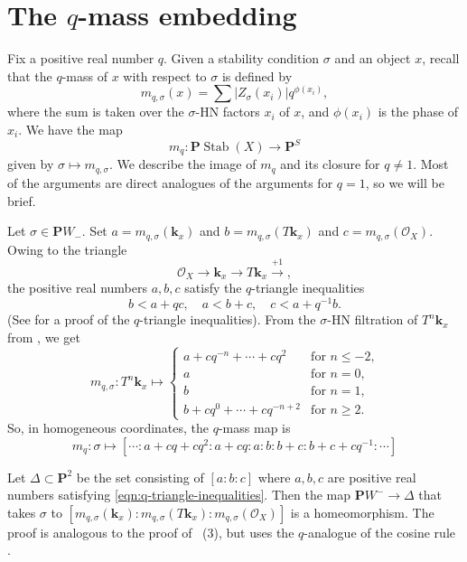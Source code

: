 \documentclass{amsart}
\begin{document}
\section{The \(q\)-mass embedding}\label{sec:qmass}
Fix a positive real number \(q\).
Given a stability condition \(\sigma\) and an object \(x\), recall that the \(q\)-mass of \(x\) with respect to \(\sigma\) is defined by
\[ m_{q, \sigma}(x) = \sum |Z_{\sigma}(x_i)| q^{\phi(x_i)},\]
where the sum is taken over the \(\sigma\)-HN factors \(x_i\) of \(x\), and \(\phi(x_i)\) is the phase of \(x_i\).
We have the map
\[ m_q \colon \mathbf{P} \operatorname{Stab}(X) \to \mathbf{P}^S\]
given by \(\sigma \mapsto m_{q,\sigma}\).
We describe the image of \(m_q\) and its closure for \(q \neq 1\).
Most of the arguments are direct analogues of the arguments for \(q = 1\), so we will be brief.

Let \(\sigma \in \mathbf{P}W_-\).
Set \(a = m_{q,\sigma}(\mathbf{k}_x)\) and \(b = m_{q,\sigma}(T\mathbf{k}_x)\) and \(c = m_{q,\sigma}(\mathcal{O}_X)\).
Owing to the triangle 
\[ \mathcal{O}_X \to \mathbf{k}_x \to T\mathbf{k}_x \xrightarrow{+1},\]
the positive real numbers \(a,b,c\) satisfy the \(q\)-triangle inequalities 
\begin{equation}\label{eqn:q-triangle-inequalities}
  b < a + qc, \quad a < b + c, \quad c < a + q^{-1}b.
\end{equation}
(See \cite[Proposition~3.3]{ike:21} for a proof of the \(q\)-triangle inequalities).
From the \(\sigma\)-HN filtration of \(T^n\mathbf{k}_x\) from , we get
\[ m_{q, \sigma} \colon T^n \mathbf{k}_x \mapsto
  \begin{cases}
    a + cq^{-n}+ \cdots + c q^{2} &\text{for \(n \leq -2\),}\\
    a &\text{for \(n = 0\),}\\
    b & \text{for \(n = 1\),}\\
    b + c q^0 + \cdots + c q^{-n+2} & \text{for \(n \geq 2\)}.
  \end{cases}
\]
So, in homogeneous coordinates, the \(q\)-mass map is
\[ m_q \colon \sigma \mapsto [ \cdots :a + cq+cq^2 : a + cq :a: b: b + c : b + c + c q^{-1} : \cdots ]\]

Let \(\Delta \subset \mathbf{P}^2\) be the set consisting of \([a:b:c]\) where \(a,b,c\) are positive real numbers satisfying \eqref{eqn:q-triangle-inequalities}.
Then the map \( \mathbf{P} W^- \to \Delta\)
that takes \(\sigma\) to \([m_{q,\sigma}(\mathbf{k}_x):m_{q,\sigma}(T\mathbf{k}_x): m_{q,\sigma}(\mathcal{O}_X)]\)
is a homeomorphism.
The proof is analogous to the proof of ~(3), but uses the \(q\)-analogue of the cosine rule \cite[Lemma~5.2]{bap.bec.lic:22}.
\end{document}
